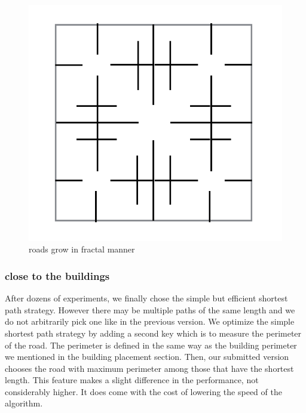\begin{figure}
\center
\includegraphics[scale=0.5]{prebuildRoad.png}
\caption{roads grow in fractal manner}
\label{fig: prebuildRoad}
\end{figure}

\subsubsection{close to the buildings}
After dozens of experiments, we finally chose the simple but efficient shortest path strategy. However there may be multiple paths of the same length and we do not arbitrarily pick one like in the previous version. We optimize the simple shortest path strategy by adding a second key which is to measure the perimeter of the road. The perimeter is defined in the same way as the building perimeter we mentioned in the building placement section. Then, our submitted version chooses the road with maximum perimeter among those that have the shortest length. This feature makes a slight difference in the performance, not considerably higher. It does come with the cost of lowering the speed of the algorithm.
